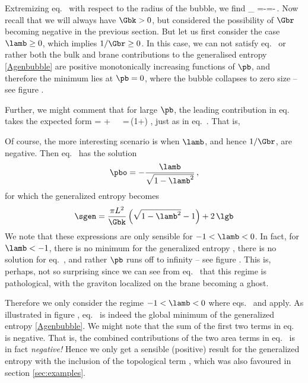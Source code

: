 Extremizing eq.~ with respect to the radius of the bubble, we find
\beq\label{gamdot}
\partial_{\pb} \qquad
\implies\qquad {}=-\lamb=-\,.
\eeq
Now recall that we will always have $\Gbk>0$, but considered the possibility of $\Gbr$ becoming negative in the previous section. But let us first consider the case $\lamb\ge 0$, which implies $1/\Gbr\ge 0$. In this case, we can not satisfy eq.~ or rather both the bulk and brane contributions to the generalised entropy \eqref{Agenbubble} are positive monotonically increasing functions of $\pb$, and therefore the minimum lies at $\pb=0$, \ie where the bubble collapses to zero size -- see figure . 

Further, we might comment that for large $\pb$, the leading contribution in eq.~ takes the expected form
\beq\label{expect4}
\sgen\simeq = +\cdots {}\ \ \ =\,(1+\lamb)\,\pb\,,
\eeq
just as in eq.~. That is, \rcm{******}


Of course, the more interesting scenario is when $\lamb$, and hence
$1/\Gbr$, are negative. Then eq.~ has the solution
\begin{align}
\pbo=-\frac{\lamb}{\sqrt{1-\lamb^2}}\,,
\label{cookie}
\end{align}
for which the generalized entropy  becomes
\begin{align}\label{Sbubble}
\sgen= \frac{\pi L^2}{\Gbk} \left( \sqrt{1-\lamb^2} - 1 \right)+2\,\lgb 
\end{align}
We note that these expressions are only sensible for $-1<\lamb<0$. In fact, for $\lamb<-1$, there is no minimum for the generalized entropy , \ie there is no solution for eq.~, and rather $\pb$ runs off to infinity -- see figure .  This is, perhaps, not so surprising since we can see from eq.~ that this regime is pathological, with the graviton localized on the brane becoming a ghost.

Therefore we only consider the regime $-1<\lamb<0$ where eqs.~ and  apply. As illustrated in figure , eq.~ is indeed the global minimum of the generalized entropy \eqref{Agenbubble}. We might note that the sum of the first two terms in eq.~ is negative. That is, the combined contributions of the two area terms in eq.~ is in fact {\it negative!} Hence we only get a sensible (\ie positive) result for the generalized entropy  with the inclusion of the topological term , which was also favoured in section \ref{sec:examples}.


